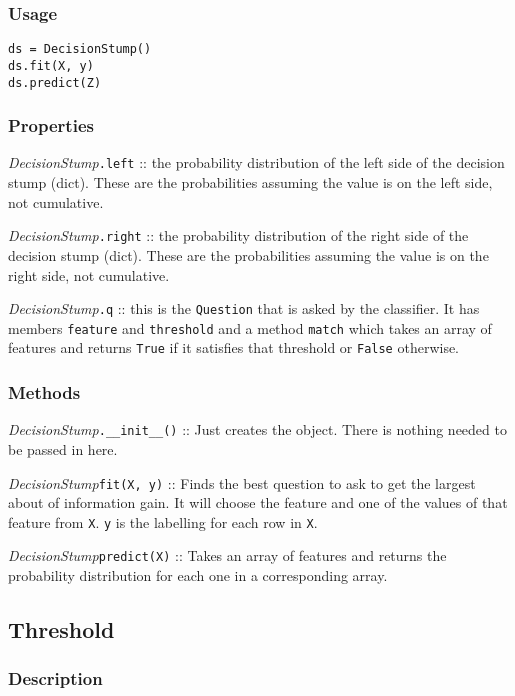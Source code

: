 \documentclass{article}
\begin{document}
\subsubsection{Usage}

\begin{verbatim}
ds = DecisionStump()
ds.fit(X, y)
ds.predict(Z)
\end{verbatim}

\subsubsection{Properties}

\textit{DecisionStump}\texttt{.left} :: the probability distribution of the left
side of the decision stump (dict).  These are the probabilities assuming the
value is on the left side, not cumulative.

\textit{DecisionStump}\texttt{.right} :: the probability distribution of the
right side of the decision stump (dict).  These are the probabilities assuming
the value is on the right side, not cumulative.

\textit{DecisionStump}\texttt{.q} :: this is the \texttt{Question} that is asked
by the classifier. It has members \texttt{feature} and \texttt{threshold} and a
method \texttt{match} which takes an array of features and returns \texttt{True}
if it satisfies that threshold or \texttt{False} otherwise.

\subsubsection{Methods}

\textit{DecisionStump}\texttt{.\_\_init\_\_()} :: Just creates the object. There
is nothing needed to be passed in here.

\textit{DecisionStump}\texttt{fit(X, y)} :: Finds the best question to ask to
get the largest about of information gain. It will choose the feature and one of
the values of that feature from \texttt{X}. \texttt{y} is the labelling for each
row in \texttt{X}.

\textit{DecisionStump}\texttt{predict(X)} :: Takes an array of features and
returns the probability distribution for each one in a corresponding array.

\subsection{Threshold}

\subsubsection{Description}
\end{document}

